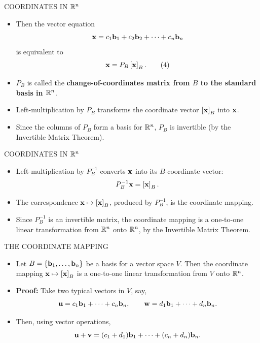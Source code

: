 \begin{frame}[shrink=8]{COORDINATES IN $\mathbb{R}^n$}
\begin{itemize}
\item Then the vector equation
\[
\mathbf{x}=c_1\mathbf{b}_1+c_2\mathbf{b}_2+\cdots+c_n\mathbf{b}_n
\]
is equivalent to
\begin{equation}
\mathbf{x}=P_B\left[\mathbf{x}\right]_{B}. \tag{4}
\end{equation}
\item $P_B$ is called the \textbf{change-of-coordinates matrix from $B$ to the standard basis in $\mathbb{R}^n$}.
\item Left-multiplication by $P_B$ transforms the coordinate vector $\left[\mathbf{x}\right]_{B}$ into $\mathbf{x}$.
\item Since the columns of $P_B$ form a basis for $\mathbb{R}^n$, $P_B$ is invertible (by the Invertible Matrix Theorem).
\end{itemize}
\end{frame}

\begin{frame}[shrink=7]{COORDINATES IN $\mathbb{R}^n$}
\begin{itemize}
\item Left-multiplication by $P_B^{-1}$ converts $\mathbf{x}$ into its $B$-coordinate vector:
\[
P_B^{-1}\mathbf{x}=\left[\mathbf{x}\right]_{B}.
\]
\item The correspondence $\mathbf{x}\mapsto\left[\mathbf{x}\right]_{B}$, produced by $P_B^{-1}$, is the coordinate mapping.
\item Since $P_B^{-1}$ is an invertible matrix, the coordinate mapping is a one-to-one linear transformation from $\mathbb{R}^n$ onto $\mathbb{R}^n$, by the Invertible Matrix Theorem.
\end{itemize}
\end{frame}

\begin{frame}[shrink=8]{THE COORDINATE MAPPING}
\begin{itemize}
\item {} Let $B=\{\mathbf{b}_1,\ldots,\mathbf{b}_n\}$ be a basis for a vector space $V$. Then the coordinate mapping $\mathbf{x}\mapsto\left[\mathbf{x}\right]_{B}$ is a one-to-one linear transformation from $V$ onto $\mathbb{R}^n$.
\item \textbf{Proof:} Take two typical vectors in $V$, say,
\[
\mathbf{u}=c_1\mathbf{b}_1+\cdots+c_n\mathbf{b}_n,
\qquad
\mathbf{w}=d_1\mathbf{b}_1+\cdots+d_n\mathbf{b}_n.
\]
\item Then, using vector operations,
\[
\mathbf{u}+\mathbf{v}=(c_1+d_1)\mathbf{b}_1+\cdots+(c_n+d_n)\mathbf{b}_n.
\]
\end{itemize}
\end{frame}


